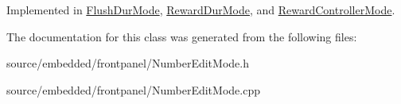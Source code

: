 Implemented in \hyperlink{class_flush_dur_mode_ac83402e2e8d25ccfc889105f04110974}{Flush\-Dur\-Mode}, \hyperlink{class_reward_dur_mode_a00251ffeaf56da8a95352c4747928319}{Reward\-Dur\-Mode}, and \hyperlink{class_reward_controller_mode_a2322aa48a2cf9029ec069df388552fa2}{Reward\-Controller\-Mode}.



The documentation for this class was generated from the following files\-:\begin{DoxyCompactItemize}
\item 
source/embedded/frontpanel/Number\-Edit\-Mode.\-h\item 
source/embedded/frontpanel/Number\-Edit\-Mode.\-cpp\end{DoxyCompactItemize}
